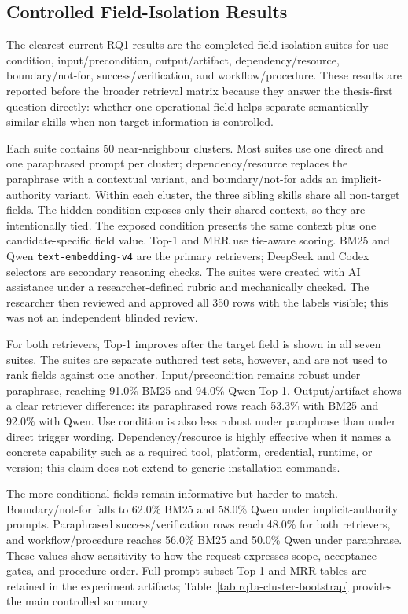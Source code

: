 \subsection{Controlled Field-Isolation Results}

The clearest current RQ1 results are the completed field-isolation suites for use condition, input/precondition, output/artifact, dependency/resource, boundary/not-for, success/verification, and workflow/procedure. These results are reported before the broader retrieval matrix because they answer the thesis-first question directly: whether one operational field helps separate semantically similar skills when non-target information is controlled.

Each suite contains 50 near-neighbour clusters. Most suites use one direct and one paraphrased prompt per cluster; dependency/resource replaces the paraphrase with a contextual variant, and boundary/not-for adds an implicit-authority variant. Within each cluster, the three sibling skills share all non-target fields. The hidden condition exposes only their shared context, so they are intentionally tied. The exposed condition presents the same context plus one candidate-specific field value. Top-1 and MRR use tie-aware scoring. BM25 and Qwen \texttt{text-embedding-v4} are the primary retrievers; DeepSeek and Codex selectors are secondary reasoning checks. The suites were created with AI assistance under a researcher-defined rubric and mechanically checked. The researcher then reviewed and approved all 350 rows with the labels visible; this was not an independent blinded review.

For both retrievers, Top-1 improves after the target field is shown in all seven suites. The suites are separate authored test sets, however, and are not used to rank fields against one another. Input/precondition remains robust under paraphrase, reaching 91.0\% BM25 and 94.0\% Qwen Top-1. Output/artifact shows a clear retriever difference: its paraphrased rows reach 53.3\% with BM25 and 92.0\% with Qwen. Use condition is also less robust under paraphrase than under direct trigger wording. Dependency/resource is highly effective when it names a concrete capability such as a required tool, platform, credential, runtime, or version; this claim does not extend to generic installation commands.

The more conditional fields remain informative but harder to match. Boundary/not-for falls to 62.0\% BM25 and 58.0\% Qwen under implicit-authority prompts. Paraphrased success/verification rows reach 48.0\% for both retrievers, and workflow/procedure reaches 56.0\% BM25 and 50.0\% Qwen under paraphrase. These values show sensitivity to how the request expresses scope, acceptance gates, and procedure order. Full prompt-subset Top-1 and MRR tables are retained in the experiment artifacts; Table~\ref{tab:rq1a-cluster-bootstrap} provides the main controlled summary.

